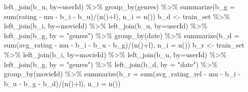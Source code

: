 \documentclass[
]{article}
\newenvironment{Shaded}{}{}
\newcommand{\AttributeTok}[1]{\textcolor[rgb]{0.49,0.56,0.16}{#1}}
\newcommand{\FunctionTok}[1]{\textcolor[rgb]{0.02,0.16,0.49}{#1}}
\newcommand{\NormalTok}[1]{#1}
\newcommand{\OtherTok}[1]{\textcolor[rgb]{0.00,0.44,0.13}{#1}}
\newcommand{\SpecialCharTok}[1]{\textcolor[rgb]{0.25,0.44,0.63}{#1}}
\newcommand{\StringTok}[1]{\textcolor[rgb]{0.25,0.44,0.63}{#1}}
\begin{document}
\begin{Shaded}
\begin{Highlighting}[]
    \FunctionTok{left\_join}\NormalTok{(b\_u, }\AttributeTok{by=}\StringTok{\textquotesingle{}userId\textquotesingle{}}\NormalTok{) }\SpecialCharTok{\%\textgreater{}\%}
    \FunctionTok{group\_by}\NormalTok{(genres) }\SpecialCharTok{\%\textgreater{}\%} 
    \FunctionTok{summarize}\NormalTok{(}\AttributeTok{b\_g =} \FunctionTok{sum}\NormalTok{(rating }\SpecialCharTok{{-}}\NormalTok{ mu }\SpecialCharTok{{-}}\NormalTok{ b\_i }\SpecialCharTok{{-}}\NormalTok{ b\_u)}\SpecialCharTok{/}\NormalTok{(}\FunctionTok{n}\NormalTok{()}\SpecialCharTok{+}\NormalTok{l), }\AttributeTok{n\_i =} \FunctionTok{n}\NormalTok{())}
\NormalTok{  b\_d }\OtherTok{\textless{}{-}}\NormalTok{ train\_set }\SpecialCharTok{\%\textgreater{}\%}
    \FunctionTok{left\_join}\NormalTok{(b\_i, }\AttributeTok{by=}\StringTok{\textquotesingle{}movieId\textquotesingle{}}\NormalTok{) }\SpecialCharTok{\%\textgreater{}\%}
    \FunctionTok{left\_join}\NormalTok{(b\_u, }\AttributeTok{by=}\StringTok{\textquotesingle{}userId\textquotesingle{}}\NormalTok{) }\SpecialCharTok{\%\textgreater{}\%} 
    \FunctionTok{left\_join}\NormalTok{(b\_g, }\AttributeTok{by =} \StringTok{"genres"}\NormalTok{) }\SpecialCharTok{\%\textgreater{}\%} 
    \FunctionTok{group\_by}\NormalTok{(date) }\SpecialCharTok{\%\textgreater{}\%} 
    \FunctionTok{summarize}\NormalTok{(}\AttributeTok{b\_d =} \FunctionTok{sum}\NormalTok{(avg\_rating }\SpecialCharTok{{-}}\NormalTok{ mu }\SpecialCharTok{{-}}\NormalTok{ b\_i }\SpecialCharTok{{-}}\NormalTok{ b\_u }\SpecialCharTok{{-}}\NormalTok{ b\_g)}\SpecialCharTok{/}\NormalTok{(}\FunctionTok{n}\NormalTok{()}\SpecialCharTok{+}\NormalTok{l), }\AttributeTok{n\_i =} \FunctionTok{n}\NormalTok{())}
\NormalTok{  b\_r }\OtherTok{\textless{}{-}}\NormalTok{ train\_set }\SpecialCharTok{\%\textgreater{}\%}
    \FunctionTok{left\_join}\NormalTok{(b\_i, }\AttributeTok{by=}\StringTok{\textquotesingle{}movieId\textquotesingle{}}\NormalTok{) }\SpecialCharTok{\%\textgreater{}\%}
    \FunctionTok{left\_join}\NormalTok{(b\_u, }\AttributeTok{by=}\StringTok{\textquotesingle{}userId\textquotesingle{}}\NormalTok{) }\SpecialCharTok{\%\textgreater{}\%} 
    \FunctionTok{left\_join}\NormalTok{(b\_g, }\AttributeTok{by =} \StringTok{"genres"}\NormalTok{) }\SpecialCharTok{\%\textgreater{}\%} 
    \FunctionTok{left\_join}\NormalTok{(b\_d, }\AttributeTok{by =} \StringTok{"date"}\NormalTok{) }\SpecialCharTok{\%\textgreater{}\%} 
    \FunctionTok{group\_by}\NormalTok{(movieId) }\SpecialCharTok{\%\textgreater{}\%} 
    \FunctionTok{summarize}\NormalTok{(}\AttributeTok{b\_r =} \FunctionTok{sum}\NormalTok{(avg\_rating\_rel }\SpecialCharTok{{-}}\NormalTok{ mu }\SpecialCharTok{{-}}\NormalTok{ b\_i }\SpecialCharTok{{-}}\NormalTok{ b\_u }\SpecialCharTok{{-}}\NormalTok{ b\_g }\SpecialCharTok{{-}}\NormalTok{ b\_d)}\SpecialCharTok{/}\NormalTok{(}\FunctionTok{n}\NormalTok{()}\SpecialCharTok{+}\NormalTok{l), }\AttributeTok{n\_i =} \FunctionTok{n}\NormalTok{())}


\end{Highlighting}
\end{Shaded}
\end{document}
